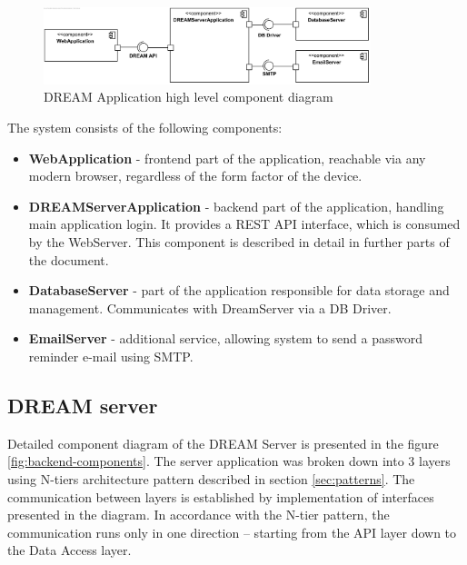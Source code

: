 \begin{figure}[H]
    \centering
    \includegraphics[width=0.85\textwidth]{diagrams/component/High Level Overview.png}
    \caption{DREAM Application high level component diagram}
    \label{fig:high-level-components}
\end{figure}

The system consists of the following components:
\begin{itemize}
    \item \textbf{WebApplication} - frontend part of the application, reachable via any modern browser, regardless of the form factor of the device.
    \item \textbf{DREAMServerApplication} - backend part of the application, handling main application login. It provides a REST API \cite{rest} interface, which is consumed by the WebServer. This component is described in detail in further parts of the document.
    \item \textbf{DatabaseServer} - part of the application responsible for data storage and management. Communicates with DreamServer via a DB Driver.
    \item \textbf{EmailServer} - additional service, allowing system to send a password reminder e-mail using SMTP.
\end{itemize}

\subsection{DREAM server}\label{subsec:backend-components}
Detailed component diagram of the DREAM Server is presented in the figure \ref{fig:backend-components}. The server application was broken down into 3 layers using N-tiers architecture pattern described in section \ref{sec:patterns}. The communication between layers is established by implementation of interfaces presented in the diagram. In accordance with the N-tier pattern, the communication runs only in one direction – starting from the API layer down to the Data Access layer. 

